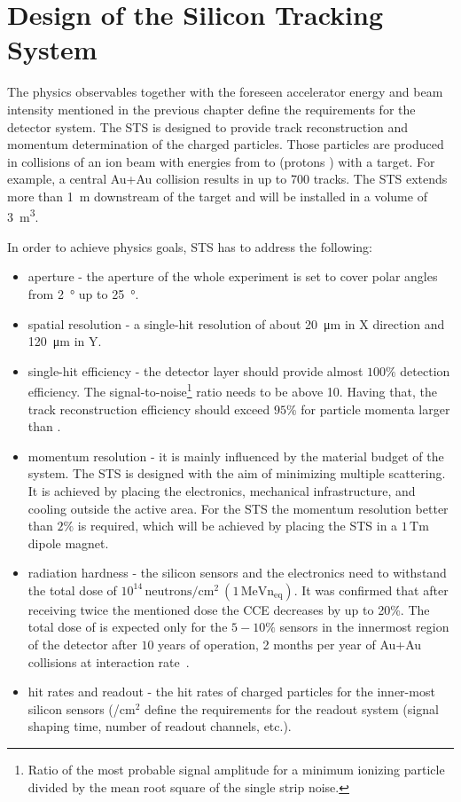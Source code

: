 \section{Design of the Silicon Tracking System}
\label{STS}

The physics observables together with the foreseen accelerator energy and beam intensity mentioned in the previous chapter define the requirements for the detector system. The \gls{STS} is designed to provide track reconstruction and momentum determination of the charged particles. Those particles are produced in collisions of an ion beam with energies from  to  (protons ) with a target. For example, a central Au+Au collision results in up to 700 tracks. The \gls{STS} extends more than \SI{1}{\metre} downstream of the target and will be installed in a volume of \SI{3}{\cubic\metre}. 

In order to achieve physics goals, \gls{STS} has to address the following:
\begin{itemize}
    \item  aperture - the aperture of the whole experiment is set to cover polar angles from \SI{2}{\degree} up to \SI{25}{\degree}.
    \item spatial resolution - a single-hit resolution of about \SI{20}{\micro\metre} in X direction and \SI{120}{\micro\metre} in Y.
    \item single-hit efficiency - the detector layer should provide almost $100\%$ detection efficiency. The signal-to-noise\footnote{Ratio of the most probable signal amplitude for a minimum ionizing particle divided by the mean root square of the single strip noise.} ratio needs to be above 10. Having that, the track reconstruction efficiency should exceed $95\%$ for particle momenta larger than . 
    \item momentum resolution - it is mainly influenced by the material budget of the system. The \gls{STS} is designed with the aim of minimizing multiple scattering. It is achieved by placing the electronics, mechanical infrastructure, and cooling outside the active area. For the \gls{STS} the momentum resolution better than $2\%$ is required, which will be achieved by placing the \gls{STS} in a $1\,\mathrm{Tm}$ dipole magnet.
    \item radiation hardness - the silicon sensors and the electronics need to withstand the total dose of $10^{14}\,\mathrm{neutrons/cm^{2}~(1\,MeV n_{eq})}$. It was confirmed that after receiving twice the mentioned dose the CCE decreases by up to 20\%. The total dose of  is expected only for the $5 - 10\%$ sensors in the innermost region of the detector after $10$ years of operation, 2 months per year of  Au+Au collisions at  interaction rate~\cite{Heuser:54798}.
    \item hit rates and readout - the hit rates of charged particles for the inner-most silicon sensors (/$\mathrm{cm^{2}}$ define the requirements for the readout system (signal shaping time, number of readout channels, etc.).
\end{itemize}


